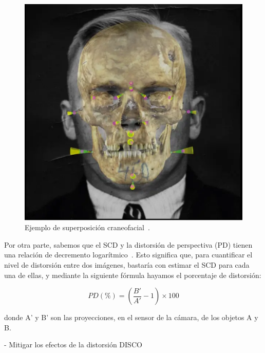 \begin{figure}[h]
	\centering
	\includegraphics[scale=0.25]{imagenes/cap1/skull_superimposition.png}
	\caption{Ejemplo de superposición craneofacial~\cite{23}.}
	\label{fig2}
\end{figure}


Por otra parte, sabemos que el SCD y la distorsión de perspectiva (PD) tienen una relación de decremento logarítmico~\cite{23}. Esto significa que, para cuantificar el nivel de distorsión entre dos imágenes, bastaría con estimar el SCD para cada una de ellas, y mediante la siguiente fórmula hayamos el porcentaje de distorsión:

\[PD(\%) = (\frac{B'}{A'} - 1) \times 100\]

donde A' y B' son las proyecciones, en el sensor de la cámara, de los objetos A y B.

- Mitigar los efectos de la distorsión  DISCO


